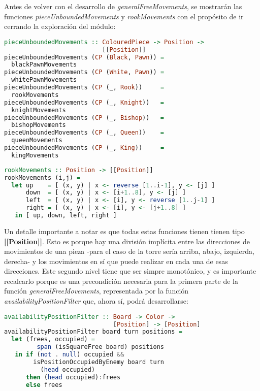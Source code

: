 \documentclass{llncs}
\begin{document}
Antes de volver con el desarrollo de \textit{generalFreeMovements}, se mostrarán las funciones \textit{pieceUnboundedMovements} y \textit{rookMovements} con el propósito de ir cerrando la exploración del módulo:

\begin{lstlisting}[frame=single, language=haskell, captionpos=b, caption=Función pieceUnboundedMovements, label={lst:piece_unbounded_movements}]
pieceUnboundedMovements :: ColouredPiece -> Position ->
                           [[Position]]
pieceUnboundedMovements (CP (Black, Pawn)) =
  blackPawnMovements
pieceUnboundedMovements (CP (White, Pawn)) =
  whitePawnMovements
pieceUnboundedMovements (CP (_, Rook))     =
  rookMovements
pieceUnboundedMovements (CP (_, Knight))   =
  knightMovements
pieceUnboundedMovements (CP (_, Bishop))   =
  bishopMovements
pieceUnboundedMovements (CP (_, Queen))    =
  queenMovements
pieceUnboundedMovements (CP (_, King))     =
  kingMovements
\end{lstlisting}

\begin{lstlisting}[frame=single, language=haskell, captionpos=b, caption=Función rookMovements, label={lst:rook_movements}]
rookMovements :: Position -> [[Position]]
rookMovements (i,j) =
  let up    = [ (x, y) | x <- reverse [1..i-1], y <- [j] ]
      down  = [ (x, y) | x <- [i+1..8], y <- [j] ]
      left  = [ (x, y) | x <- [i], y <- reverse [1..j-1] ]
      right = [ (x, y) | x <- [i], y <- [j+1..8] ]
   in [ up, down, left, right ]
\end{lstlisting}

Un detalle importante a notar es que todas estas funciones tienen tienen tipo \textbf{[[Position]]}. Esto es porque hay una división implícita entre las direcciones de movimientos de una pieza -para el caso de la torre sería arriba, abajo, izquierda, derecha- y los movimientos en sí que puede realizar en cada una de esas direcciones. Este segundo nivel tiene que ser simpre monotónico, y es importante recalcarlo porque es una precondición necesaria para la primera parte de la función \textit{generalFreeMovements}, representada por la función \textit{availabilityPositionFilter} que, ahora sí, podrá desarrollarse:


\begin{lstlisting}[frame=single, language=haskell, captionpos=b, caption=Función availabilityPositionFilter, label={lst:availability_position_filter}]
availabilityPositionFilter :: Board -> Color ->
                              [Position] -> [Position]
availabilityPositionFilter board turn positions =
  let (frees, occupied) =
         span (isSquareFree board) positions
   in if (not . null) occupied &&
        isPositionOccupiedByEnemy board turn
          (head occupied)
      then (head occupied):frees
      else frees
\end{lstlisting}
\end{document}

